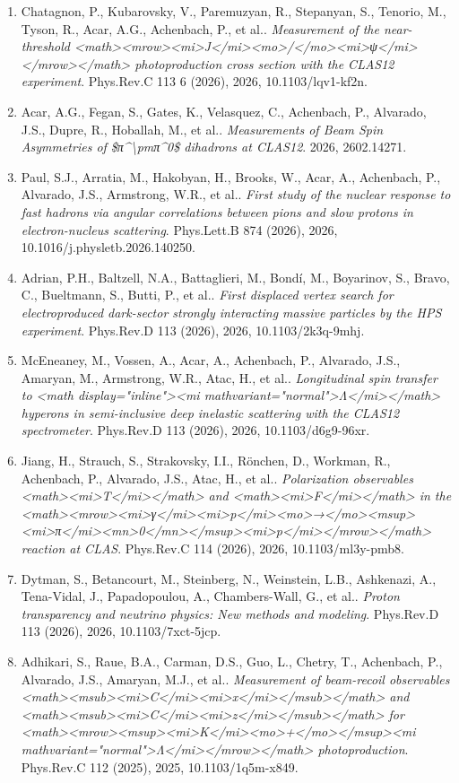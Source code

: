 \begin{enumerate}
\item Chatagnon, P., Kubarovsky, V., Paremuzyan, R., Stepanyan, S., Tenorio, M., Tyson, R., Acar, A.G., Achenbach, P., et al.. \textit{Measurement of the near-threshold <math><mrow><mi>J</mi><mo>/</mo><mi>ψ</mi></mrow></math> photoproduction cross section with the CLAS12 experiment}. Phys.Rev.C 113 6 (2026), 2026, 10.1103/lqv1-kf2n.
\item Acar, A.G., Fegan, S., Gates, K., Velasquez, C., Achenbach, P., Alvarado, J.S., Dupre, R., Hoballah, M., et al.. \textit{Measurements of Beam Spin Asymmetries of \$π\textasciicircum{}\textbackslash{}pmπ\textasciicircum{}0\$ dihadrons at CLAS12}. 2026, 2602.14271.
\item Paul, S.J., Arratia, M., Hakobyan, H., Brooks, W., Acar, A., Achenbach, P., Alvarado, J.S., Armstrong, W.R., et al.. \textit{First study of the nuclear response to fast hadrons via angular correlations between pions and slow protons in electron-nucleus scattering}. Phys.Lett.B 874 (2026), 2026, 10.1016/j.physletb.2026.140250.
\item Adrian, P.H., Baltzell, N.A., Battaglieri, M., Bondí, M., Boyarinov, S., Bravo, C., Bueltmann, S., Butti, P., et al.. \textit{First displaced vertex search for electroproduced dark-sector strongly interacting massive particles by the HPS experiment}. Phys.Rev.D 113 (2026), 2026, 10.1103/2k3q-9mhj.
\item McEneaney, M., Vossen, A., Acar, A., Achenbach, P., Alvarado, J.S., Amaryan, M., Armstrong, W.R., Atac, H., et al.. \textit{Longitudinal spin transfer to <math display="inline"><mi mathvariant="normal">Λ</mi></math> hyperons in semi-inclusive deep inelastic scattering with the CLAS12 spectrometer}. Phys.Rev.D 113 (2026), 2026, 10.1103/d6g9-96xr.
\item Jiang, H., Strauch, S., Strakovsky, I.I., Rönchen, D., Workman, R., Achenbach, P., Alvarado, J.S., Atac, H., et al.. \textit{Polarization observables <math><mi>T</mi></math> and <math><mi>F</mi></math> in the <math><mrow><mi>γ</mi><mi>p</mi><mo>→</mo><msup><mi>π</mi><mn>0</mn></msup><mi>p</mi></mrow></math> reaction at CLAS}. Phys.Rev.C 114 (2026), 2026, 10.1103/ml3y-pmb8.
\item Dytman, S., Betancourt, M., Steinberg, N., Weinstein, L.B., Ashkenazi, A., Tena-Vidal, J., Papadopoulou, A., Chambers-Wall, G., et al.. \textit{Proton transparency and neutrino physics: New methods and modeling}. Phys.Rev.D 113 (2026), 2026, 10.1103/7xct-5jcp.
\item Adhikari, S., Raue, B.A., Carman, D.S., Guo, L., Chetry, T., Achenbach, P., Alvarado, J.S., Amaryan, M.J., et al.. \textit{Measurement of beam-recoil observables <math><msub><mi>C</mi><mi>x</mi></msub></math> and <math><msub><mi>C</mi><mi>z</mi></msub></math> for <math><mrow><msup><mi>K</mi><mo>+</mo></msup><mi mathvariant="normal">Λ</mi></mrow></math> photoproduction}. Phys.Rev.C 112 (2025), 2025, 10.1103/1q5m-x849.

\end{enumerate}
